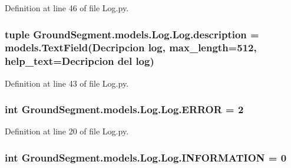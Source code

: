 Definition at line 46 of file Log.\+py.

\hypertarget{class_ground_segment_1_1models_1_1_log_1_1_log_aec39855e51031089ade633107205980c}{}
\subsubsection[{description}]{\setlength{\rightskip}{0pt plus 5cm}tuple Ground\+Segment.\+models.\+Log.\+Log.\+description = models.\+Text\+Field(\textquotesingle{}Decripcion log\textquotesingle{}, max\+\_\+length=512, help\+\_\+text=\textquotesingle{}Decripcion del log\textquotesingle{})\hspace{0.3cm}{\ttfamily [static]}}\label{class_ground_segment_1_1models_1_1_log_1_1_log_aec39855e51031089ade633107205980c}


Definition at line 43 of file Log.\+py.

\hypertarget{class_ground_segment_1_1models_1_1_log_1_1_log_a2a3ccda2ab71251c423d1ca45863f699}{}
\subsubsection[{E\+R\+R\+O\+R}]{\setlength{\rightskip}{0pt plus 5cm}int Ground\+Segment.\+models.\+Log.\+Log.\+E\+R\+R\+O\+R = 2\hspace{0.3cm}{\ttfamily [static]}}\label{class_ground_segment_1_1models_1_1_log_1_1_log_a2a3ccda2ab71251c423d1ca45863f699}


Definition at line 20 of file Log.\+py.

\hypertarget{class_ground_segment_1_1models_1_1_log_1_1_log_ac016eb00e329747a1632e3109e7e7426}{}
\subsubsection[{I\+N\+F\+O\+R\+M\+A\+T\+I\+O\+N}]{\setlength{\rightskip}{0pt plus 5cm}int Ground\+Segment.\+models.\+Log.\+Log.\+I\+N\+F\+O\+R\+M\+A\+T\+I\+O\+N = 0\hspace{0.3cm}{\ttfamily [static]}}\label{class_ground_segment_1_1models_1_1_log_1_1_log_ac016eb00e329747a1632e3109e7e7426}



